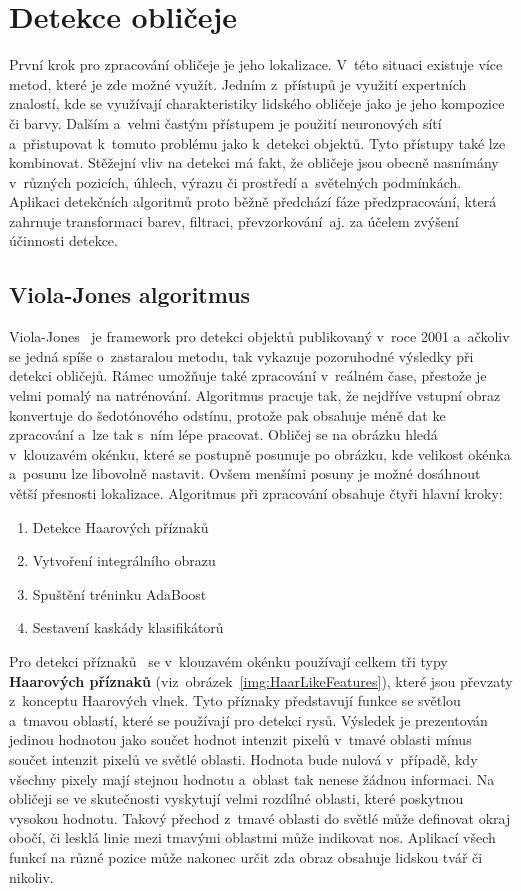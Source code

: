 \section{Detekce obličeje}
\label{sec:DetekceObličeje}
První krok pro zpracování obličeje je jeho lokalizace. V~této situaci existuje více metod, které je zde možné využít. Jedním z~přístupů je využití expertních znalostí, kde se využívají charakteristiky lidského obličeje jako je jeho kompozice či barvy. Dalším a~velmi častým přístupem je použití neuronových sítí a~přistupovat k~tomuto problému jako k~detekci objektů. Tyto přístupy také lze kombinovat. Stěžejní vliv na detekci má fakt, že obličeje jsou obecně nasnímány v~různých pozicích, úhlech, výrazu či prostředí a~světelných podmínkách. Aplikaci detekčních algoritmů proto běžně předchází fáze předzpracování, která zahrnuje transformaci barev, filtraci, převzorkování~aj. za účelem zvýšení účinnosti detekce.

\subsection{Viola-Jones algoritmus}
Viola-Jones~\cite{website:FaceDetectionViolaJones} je framework pro detekci objektů publikovaný v~roce 2001 a~ačkoliv se jedná spíše o~zastaralou metodu, tak vykazuje pozoruhodné výsledky při detekci obličejů. Rámec umožňuje také zpracování v~reálném čase, přestože je velmi pomalý na natrénování. Algoritmus pracuje tak, že nejdříve vstupní obraz konvertuje do šedotónového odstínu, protože pak obsahuje méně dat ke zpracování a~lze tak s~ním lépe pracovat. Obličej se na obrázku hledá v~klouzavém okénku, které se postupně posunuje po obrázku, kde velikost okénka a~posunu lze libovolně nastavit. Ovšem menšími posuny je možné dosáhnout větší přesnosti lokalizace. Algoritmus při zpracování obsahuje čtyři hlavní kroky:

\begin{enumerate}
    \item Detekce Haarových příznaků
    \item Vytvoření integrálního obrazu
    \item Spuštění tréninku AdaBoost
    \item Sestavení kaskády klasifikátorů
\end{enumerate}

Pro detekci příznaků~\cite{website:FaceDetectionViolaJones, website:FacialRecognitionViolaJones} se v~klouzavém okénku používají celkem tři typy \textbf{Haarových příznaků} (viz~obrázek~\ref{img:HaarLikeFeatures}), které jsou převzaty z~konceptu Haarových vlnek. Tyto příznaky představují funkce se světlou a~tmavou oblastí, které se používají pro detekci rysů. Výsledek je prezentován jedinou hodnotou jako součet hodnot intenzit pixelů v~tmavé oblasti mínus součet intenzit pixelů ve světlé oblasti. Hodnota bude nulová v~případě, kdy všechny pixely mají stejnou hodnotu a~oblast tak nenese žádnou informaci. Na obličeji se ve skutečnosti vyskytují velmi rozdílné oblasti, které poskytnou vysokou hodnotu. Takový přechod z~tmavé oblasti do světlé může definovat okraj obočí, či lesklá linie mezi tmavými oblastmi může indikovat nos. Aplikací všech funkcí na různé pozice může nakonec určit zda obraz obsahuje lidskou tvář či nikoliv.

